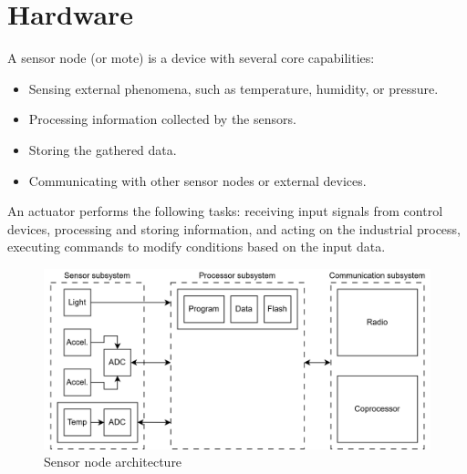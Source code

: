 \section{Hardware}

\begin{definition}
    A sensor node (or mote) is a device with several core capabilities:
    \begin{itemize}
        \item Sensing external phenomena, such as temperature, humidity, or pressure.
        \item Processing information collected by the sensors.
        \item Storing the gathered data.
        \item Communicating with other sensor nodes or external devices.
    \end{itemize}
\end{definition}
\noindent An actuator performs the following tasks: receiving input signals from control devices, processing and storing information, and acting on the industrial process, executing commands to modify conditions based on the input data.
\begin{figure}[H]
    \centering
    \includegraphics[width=0.75\linewidth]{images/sn.png}
    \caption{Sensor node architecture}
\end{figure}

